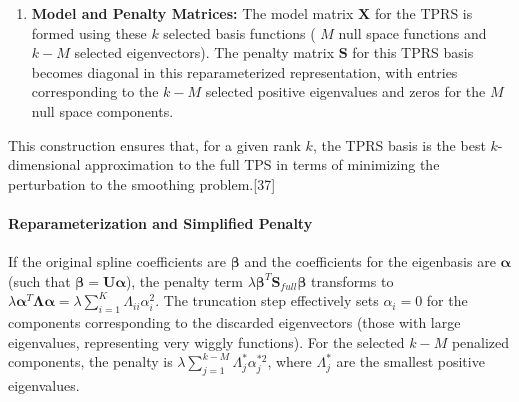 \documentclass[11pt, a4paper]{article}
\begin{document}
\begin{itemize}
\begin{enumerate}
\begin{itemize}
 \end{itemize}
 \item \textbf{Model and Penalty Matrices:} The model matrix $\mathbf{X}$ for the TPRS is formed using these $k$ selected basis functions ( $M$ null space functions and $k-M$ selected eigenvectors). The penalty matrix $\mathbf{S}$ for this TPRS basis becomes diagonal in this reparameterized representation, with entries corresponding to the $k-M$ selected positive eigenvalues and zeros for the $M$ null space components.
\end{enumerate}
This construction ensures that, for a given rank $k$, the TPRS basis is the best $k$-dimensional approximation to the full TPS in terms of minimizing the perturbation to the smoothing problem.[37]

\paragraph{Reparameterization and Simplified Penalty}
If the original spline coefficients are $\boldsymbol{\beta}$ and the coefficients for the eigenbasis are $\boldsymbol{\alpha}$ (such that $\boldsymbol{\beta} = \mathbf{U}\boldsymbol{\alpha}$), the penalty term $\lambda \boldsymbol{\beta}^T \mathbf{S}_{full} \boldsymbol{\beta}$ transforms to $\lambda \boldsymbol{\alpha}^T \mathbf{\Lambda} \boldsymbol{\alpha} = \lambda \sum_{i=1}^{K} \Lambda_{ii} \alpha_i^2$. The truncation step effectively sets $\alpha_i = 0$ for the components corresponding to the discarded eigenvectors (those with large eigenvalues, representing very wiggly functions). For the selected $k-M$ penalized components, the penalty is $\lambda \sum_{j=1}^{k-M} \Lambda_{j}^* \alpha_j^{*2}$, where $\Lambda_j^*$ are the smallest positive eigenvalues.


\end{itemize}
\end{document}
